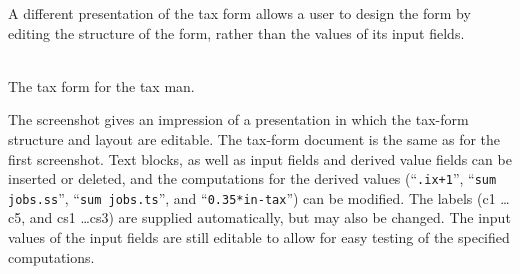 \documentclass{speauth}
\begin{document}

A different presentation of the tax form allows a user to design the form by editing the structure of the form, rather than the values of its input fields.

\begin{center}
\\ [3mm]  %
{\normalsize \sf The tax form for the tax man.}
\end{center}

The screenshot gives an impression of a presentation in which the tax-form structure and layout are editable. The tax-form document is the same as for the first screenshot. Text blocks, as well as input fields and derived value fields can be inserted or deleted, and the computations for the derived values (``{\tt .ix+1}'', ``{\tt sum jobs.ss}'', ``{\tt sum jobs.ts}'', and ``{\tt 0.35*in-tax}'') can be modified. \bc The labels (c1 \dots c5, and cs1 \dots cs3) are supplied automatically, but may also be changed. \ec The input values of the input fields are still editable to allow for easy testing of the specified computations. 
\end{document}
